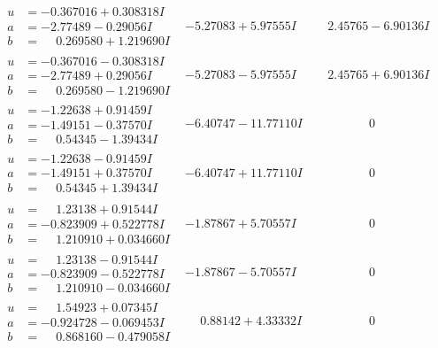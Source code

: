 \documentclass[1p]{elsarticle_modified}
\theoremstyle{definition}
\begin{document}
$$\begin{array}{c|c|c}
\begin{aligned}
u &= -0.367016 + 0.308318 I \\
a &= -2.77489 - 0.29056 I \\
b &= \phantom{-}0.269580 + 1.219690 I\end{aligned}
 & -5.27083 + 5.97555 I & \phantom{-}2.45765 - 6.90136 I \\ \hline\begin{aligned}
u &= -0.367016 - 0.308318 I \\
a &= -2.77489 + 0.29056 I \\
b &= \phantom{-}0.269580 - 1.219690 I\end{aligned}
 & -5.27083 - 5.97555 I & \phantom{-}2.45765 + 6.90136 I \\ \hline\begin{aligned}
u &= -1.22638 + 0.91459 I \\
a &= -1.49151 - 0.37570 I \\
b &= \phantom{-}0.54345 - 1.39434 I\end{aligned}
 & -6.40747 - 11.77110 I & \phantom{-0.000000 } 0 \\ \hline\begin{aligned}
u &= -1.22638 - 0.91459 I \\
a &= -1.49151 + 0.37570 I \\
b &= \phantom{-}0.54345 + 1.39434 I\end{aligned}
 & -6.40747 + 11.77110 I & \phantom{-0.000000 } 0 \\ \hline\begin{aligned}
u &= \phantom{-}1.23138 + 0.91544 I \\
a &= -0.823909 + 0.522778 I \\
b &= \phantom{-}1.210910 + 0.034660 I\end{aligned}
 & -1.87867 + 5.70557 I & \phantom{-0.000000 } 0 \\ \hline\begin{aligned}
u &= \phantom{-}1.23138 - 0.91544 I \\
a &= -0.823909 - 0.522778 I \\
b &= \phantom{-}1.210910 - 0.034660 I\end{aligned}
 & -1.87867 - 5.70557 I & \phantom{-0.000000 } 0 \\ \hline\begin{aligned}
u &= \phantom{-}1.54923 + 0.07345 I \\
a &= -0.924728 - 0.069453 I \\
b &= \phantom{-}0.868160 - 0.479058 I\end{aligned}
 & \phantom{-}0.88142 + 4.33332 I & \phantom{-0.000000 } 0 \\ \hline\begin{aligned}

\end{aligned}
\end{array}$$
\end{document}

